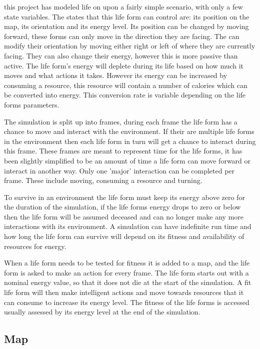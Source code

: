 \documentclass[12pt]{article}
\begin{document}
this project has modeled life on upon a fairly simple scenario, with only a few state variables. The states that this life form
can control are: its position on the map, its orientation and its energy level. Its position can be changed by moving forward, these 
forms can only move in the direction they are facing. The can modify their orientation by moving either right or left of where they 
are currently facing. They can also change their energy, however this is more passive than active. The life form's energy will
deplete during its life based on how much it moves and what actions it takes. However its energy can be increased by consuming a 
resource, this resource will contain a number of calories which can be converted into energy. This conversion rate is variable
depending on the life forms parameters. 

The simulation is split up into frames, during each frame the life form has a chance to move and interact with the environment. If their
are multiple life forms in the environment then each life form in turn will get a chance to interact during this frame. These frames are
meant to represent time for the life forms, it has been slightly simplified to be an amount of time a life form can move forward or interact in another way. Only one 'major' interaction can be completed per frame. These include moving, consuming a resource and turning.

To survive in an environment the life form must keep its energy above zero for the duration of the simulation, if the life forms energy
drops to zero or below then the life form will be assumed deceased and can no longer make any more interactions with its environment. A simulation can have indefinite run time and how long the life form can survive will depend on its fitness and availability of resources for energy.

When a life form needs to be tested for fitness it is added to a map, and the life form is asked to make an action for every frame. The life form starts out
with a nominal energy value, so that it does not die at the start of the simulation. A fit life form will then make intelligent actions and move towards resources
that it can consume to increase its energy level. The fitness of the life forms is accessed usually assessed by its energy level at the end of the simulation. 


\subsection{Map}
\end{document}
